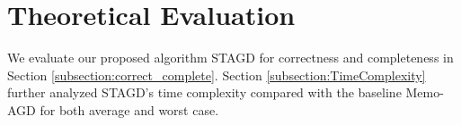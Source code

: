 \documentclass[acmsmall]{acmart}
\begin{document}

\section{Theoretical Evaluation}
\label{section:TheoreticalEvaluation}
We evaluate our proposed algorithm STAGD for correctness and completeness in Section \ref{subsection:correct_complete}. Section \ref{subsection:TimeComplexity} further analyzed STAGD's time complexity compared with the baseline Memo-AGD for both average and worst case.
\end{document}
